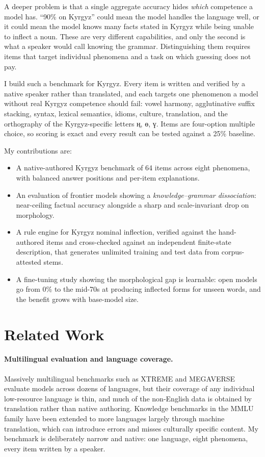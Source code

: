 \documentclass{article}
\newcommand{\ky}[1]{\foreignlanguage{russian}{#1}}
\begin{document}
A deeper problem is that a single aggregate accuracy hides \emph{which} competence a
model has. ``90\% on Kyrgyz'' could mean the model handles the language well, or it
could mean the model knows many facts stated in Kyrgyz while being unable to inflect a
noun. These are very different capabilities, and only the second is what a speaker
would call knowing the grammar. Distinguishing them requires items that target
individual phenomena and a task on which guessing does not pay.

I build such a benchmark for Kyrgyz. Every item is written and verified by a native
speaker rather than translated, and each targets one phenomenon a model without real
Kyrgyz competence should fail: vowel harmony, agglutinative suffix stacking, syntax,
lexical semantics, idioms, culture, translation, and the orthography of the
Kyrgyz-specific letters \ky{ң}, \ky{ө}, \ky{ү}. Items are four-option multiple choice,
so scoring is exact and every result can be tested against a 25\% baseline.

My contributions are:
\begin{itemize}
  \item A native-authored Kyrgyz benchmark of 64 items across eight phenomena, with
        balanced answer positions and per-item explanations.
  \item An evaluation of frontier models showing a \emph{knowledge--grammar
        dissociation}: near-ceiling factual accuracy alongside a sharp and
        scale-invariant drop on morphology.
  \item A rule engine for Kyrgyz nominal inflection, verified against the
        hand-authored items and cross-checked against an independent finite-state
        description, that generates unlimited training and test data from
        corpus-attested stems.
  \item A fine-tuning study showing the morphological gap is learnable: open models
        go from 0\% to the mid-70s at producing inflected forms for unseen words, and
        the benefit grows with base-model size.
\end{itemize}

\section{Related Work}
\label{sec:related}

\paragraph{Multilingual evaluation and language coverage.}
Massively multilingual benchmarks such as XTREME \cite{hu2020xtreme} and
MEGAVERSE \cite{ahuja2024megaverse} evaluate models across dozens of languages, but
their coverage of any individual low-resource language is thin, and much of the
non-English data is obtained by translation rather than native authoring. Knowledge
benchmarks in the MMLU family \cite{hendrycks2021mmlu} have been extended to more
languages largely through machine translation, which can introduce errors and misses
culturally specific content. My benchmark is deliberately narrow and native: one
language, eight phenomena, every item written by a speaker.
\end{document}
